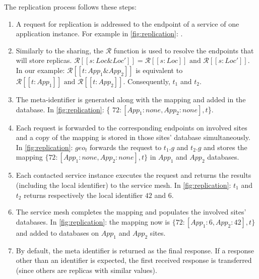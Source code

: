 The replication process follows these steps:
\begin{enumerate}
\item
  A request for replication is addressed to the endpoint of a
  service of one application instance.  For example in
  \autoref{fig:replication}: .

\item
  Similarly to the sharing, the $\mathcal{R}$ function is used to
  resolve the endpoints that will store replicas. $\mathcal{R}[\![ s :
      Loc \& Loc' ]\!] = \mathcal{R}[\![ s : Loc ]\!]  \text{ and }
  \mathcal{R}[\![ s : Loc' ]\!]$. In our example:
  $\mathcal{R}[\![ t : App_1 \& App_2 ]\!]$ is equivalent to
  $\mathcal{R}[\![ t : App_1 ]\!]  \text{ and } \mathcal{R}[\![ t :
      App_2 ]\!]$. Consequently, $t_1$ and $t_2$.

\item
  The meta-identifier is generated along with the mapping and
  added in the database. In \autoref{fig:replication}: \{ $ 72:
  [App_1: \mathit{none}, App_2: \mathit{none}], t$\}.

\item
  Each request is forwarded to the corresponding endpoints on involved
  sites and a copy of the mapping is stored in those sites' database
  simultaneously. In \autoref{fig:replication}: $geo_t$ forwards the request to
  $t_1.g$ and $t_2.g$ and stores the mapping $\{72: [App_1:
    \mathit{none}, App_2: \mathit{none}], t\}$ in $App_1$ and $App_2$
  databases.

\item
  Each contacted service instance executes the request and returns the
  results (including the local identifier) to the service mesh.  In
  \autoref{fig:replication}: $t_1$ and $t_2$ returns respectively the
  local identifier $42$ and $6$.

\item
  The service mesh completes the mapping and populates the involved
  sites' databases. In \autoref{fig:replication}: the mapping now is
  $\{72: [App_1: 6, App_2: 42], t\}$ and added to databases on $App_1$
  and $App_2$ sites.

\item
  By default, the meta identifier is returned as the final response.
  If a response other than an identifier is expected, the first
  received response is transferred (since others are replicas with
  similar values).
\end{enumerate}


